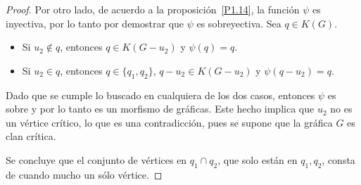\documentclass[12pt]{book}
\theoremstyle{definition}
\begin{document}
\begin{proof}
Por otro lado, de acuerdo a la proposición~\ref{P1.14}, la función $\psi$ es inyectiva, por lo tanto por demostrar que $\psi$ es sobreyectiva. Sea $q\in K(G)$. 
\begin{itemize}
\item Si $u_2\notin q$, entonces $q\in K(G-u_2)$ y $\psi(q)=q$.
\item Si $u_2\in q$, entonces $q\in \{q_1,q_2\}$, $q-u_2\in K(G-u_2)$ y $\psi(q-u_2)=q$.
\end{itemize}
Dado que se cumple lo buscado en cualquiera de los dos casos, entonces $\psi$ es sobre y por lo tanto es un morfismo de gráficas. Este hecho implica que $u_2$ no es un vértice crítico, lo que es una contradicción, pues se supone que la gráfica $G$ es clan crítica.

Se concluye que el conjunto de vértices en $q_1\cap q_2$, que solo están en $q_1,q_2$, consta de cuando mucho un sólo vértice.
\end{proof}
\end{document}
